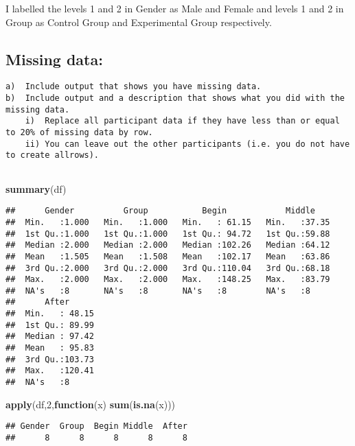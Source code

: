 \documentclass[
]{article}
\newenvironment{Shaded}{\begin{snugshade}}{\end{snugshade}}
\newcommand{\ControlFlowTok}[1]{\textcolor[rgb]{0.13,0.29,0.53}{\textbf{#1}}}
\newcommand{\DecValTok}[1]{\textcolor[rgb]{0.00,0.00,0.81}{#1}}
\newcommand{\KeywordTok}[1]{\textcolor[rgb]{0.13,0.29,0.53}{\textbf{#1}}}
\newcommand{\NormalTok}[1]{#1}
\begin{document}
I labelled the levels 1 and 2 in Gender as Male and Female and levels 1
and 2 in Group as Control Group and Experimental Group respectively.

\hypertarget{missing-data}{%
\subsection{Missing data:}\label{missing-data}}

\begin{verbatim}
a)  Include output that shows you have missing data.
b)  Include output and a description that shows what you did with the missing data.
    i)  Replace all participant data if they have less than or equal to 20% of missing data by row. 
    ii) You can leave out the other participants (i.e. you do not have to create allrows). 
    
\end{verbatim}

\begin{Shaded}
\begin{Highlighting}[]
\KeywordTok{summary}\NormalTok{(df)}
\end{Highlighting}
\end{Shaded}

\begin{verbatim}
##      Gender          Group           Begin            Middle     
##  Min.   :1.000   Min.   :1.000   Min.   : 61.15   Min.   :37.35  
##  1st Qu.:1.000   1st Qu.:1.000   1st Qu.: 94.72   1st Qu.:59.88  
##  Median :2.000   Median :2.000   Median :102.26   Median :64.12  
##  Mean   :1.505   Mean   :1.508   Mean   :102.17   Mean   :63.86  
##  3rd Qu.:2.000   3rd Qu.:2.000   3rd Qu.:110.04   3rd Qu.:68.18  
##  Max.   :2.000   Max.   :2.000   Max.   :148.25   Max.   :83.79  
##  NA's   :8       NA's   :8       NA's   :8        NA's   :8      
##      After       
##  Min.   : 48.15  
##  1st Qu.: 89.99  
##  Median : 97.42  
##  Mean   : 95.83  
##  3rd Qu.:103.73  
##  Max.   :120.41  
##  NA's   :8
\end{verbatim}

\begin{Shaded}
\begin{Highlighting}[]
\KeywordTok{apply}\NormalTok{(df,}\DecValTok{2}\NormalTok{,}\ControlFlowTok{function}\NormalTok{(x) }\KeywordTok{sum}\NormalTok{(}\KeywordTok{is.na}\NormalTok{(x)))}
\end{Highlighting}
\end{Shaded}

\begin{verbatim}
## Gender  Group  Begin Middle  After 
##      8      8      8      8      8
\end{verbatim}
\end{document}
